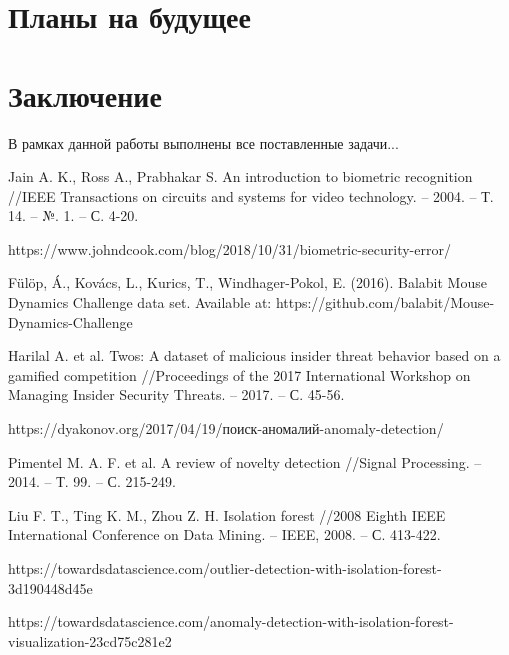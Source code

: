 \documentclass[12pt]{article}
\begin{document}
    \section{Планы на будущее}
    \label{sec:Future}

    \newpage



    \section{Заключение}
    \label{sec:Conclusion}

    \par В рамках данной работы выполнены все поставленные задачи...

    \newpage



    \begin{thebibliography}{20}
        Jain A. K., Ross A., Prabhakar S. An introduction to biometric recognition //IEEE Transactions on circuits and systems for video technology. – 2004. – Т. 14. – №. 1. – С. 4-20.

        https://www.johndcook.com/blog/2018/10/31/biometric-security-error/

        Fülöp, Á., Kovács, L., Kurics, T., Windhager-Pokol, E. (2016). Balabit Mouse Dynamics Challenge data set. Available at: https://github.com/balabit/Mouse-Dynamics-Challenge

        Harilal A. et al. Twos: A dataset of malicious insider threat behavior based on a gamified competition //Proceedings of the 2017 International Workshop on Managing Insider Security Threats. – 2017. – С. 45-56.

        https://dyakonov.org/2017/04/19/поиск-аномалий-anomaly-detection/

        Pimentel M. A. F. et al. A review of novelty detection //Signal Processing. – 2014. – Т. 99. – С. 215-249.

        Liu F. T., Ting K. M., Zhou Z. H. Isolation forest //2008 Eighth IEEE International Conference on Data Mining. – IEEE, 2008. – С. 413-422.

        https://towardsdatascience.com/outlier-detection-with-isolation-forest-3d190448d45e

        https://towardsdatascience.com/anomaly-detection-with-isolation-forest-visualization-23cd75c281e2


\end{thebibliography}
\end{document}
